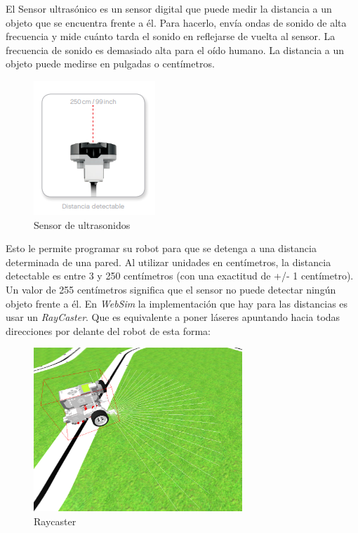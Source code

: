 El Sensor ultrasónico es un sensor digital que puede medir la distancia a un objeto que se encuentra frente a él. Para hacerlo, envía ondas de sonido de alta frecuencia y mide cuánto tarda el sonido en reflejarse de vuelta al sensor. La frecuencia de sonido es demasiado alta para el oído humano.
La distancia a un objeto puede medirse en pulgadas o centímetros.\newline
\begin{figure}
    \centering
    \includegraphics[width=0.5\linewidth]{img/ultrasonidos.png}
    \caption{Sensor de ultrasonidos}
    \label{fig:ultrasonido}
\end{figure}
Esto le permite programar su robot para que se detenga a una distancia determinada de una pared. Al utilizar unidades en centímetros, la distancia detectable es entre 3 y 250 centímetros (con una exactitud de +/- 1 centímetro). Un valor de 255 centímetros significa que el sensor no puede
detectar ningún objeto frente a él.\newline
En \textit{WebSim} la implementación que hay para las distancias es  usar un \textit{RayCaster}. Que es equivalente a poner láseres apuntando hacia todas direcciones por delante del robot de esta forma:

\begin{figure}[H]
    \centering
    \includegraphics[width=0.7\textwidth]{img/pruebaUS.png}
    \caption{Raycaster} \label{fig:raycaster}
\end{figure}

